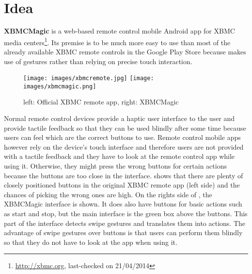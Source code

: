 \section{Idea}

\textbf{XBMCMagic} is a web-based remote control mobile Android app for XBMC media centers\footnote{\url{http://xbmc.org}, last-checked on 21/04/2014}. Its premise is to be much more easy to use than most of the already available XBMC remote controls in the Google Play Store because makes use of gestures rather than relying on precise touch interaction.

\begin{figure}[h]
  \centerline{
    \texttt{[image: images/xbmcremote.jpg]}
    \texttt{[image: images/xbmcmagic.png]}
  }
  \caption[left: Official XBMC remote app, right: XBMCMagic]{left: Official XBMC remote app, right: XBMCMagic}
  \label{fig:xbmcremote}
\end{figure}

Normal remote control devices provide a haptic user interface to the user and provide tactile feedback so that they can be used blindly after some time because users can feel which are the correct buttons to use. Remote control mobile apps however rely on the device's touch interface and therefore users are not provided with a tactile feedback and they have to look at the remote control app while using it. Otherwise, they might press the wrong buttons for certain actions because the buttons are too close in the interface.  shows that there are plenty of closely positioned buttons in the original XBMC remote app (left side) and the chances of picking the wrong ones are high. On the rights side of , the XBMCMagic interface is shown. It does also have buttons for basic actions such as start and stop, but the main interface is the green box above the buttons. This part of the interface detects swipe gestures and translates them into actions. The advantage of swipe gestures over buttons is that users can perform them blindly so that they do not have to look at the app when using it.